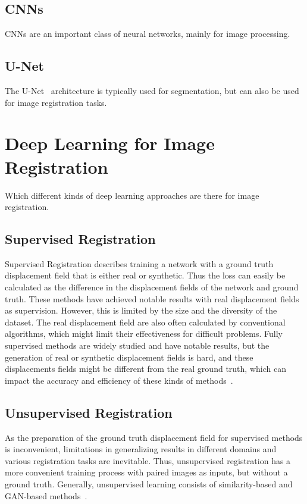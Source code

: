 \documentclass[english,version-2022-01]{uzl-thesis} %
\begin{document}
\subsection{CNNs}
CNNs are an important class of neural networks, mainly for image processing.

\subsection{U-Net}
The U-Net~\cite{U-Net} architecture is typically used for segmentation, but can also be used for image registration tasks.

\section{Deep Learning for Image Registration}
Which different kinds of deep learning approaches are there for image registration.

\subsection{Supervised Registration}
Supervised Registration describes training a network with a ground truth displacement field that is either real or synthetic. Thus the loss can easily be calculated as the difference in the displacement fields of the network and ground truth. These methods have achieved notable results with real displacement fields as supervision. However, this is limited by the size and the diversity of the dataset. The real displacement field are also often calculated by conventional algorithms, which might limit their effectiveness for difficult problems. Fully supervised methods are widely studied and have notable results, but the generation of real or synthetic displacement fields is hard, and these displacements fields might be different from the real ground truth, which can impact the accuracy and efficiency of these kinds of methods~\cite{Zou2022}.

\subsection{Unsupervised Registration}
As the preparation of the ground truth displacement field for supervised methods is inconvenient, limitations in generalizing results in different domains and various registration tasks are inevitable. Thus, unsupervised registration has a more convenient training process with paired images as inputs, but without a ground truth. Generally, unsupervised learning consists of similarity-based and GAN-based methods~\cite{Zou2022}.
\end{document}
